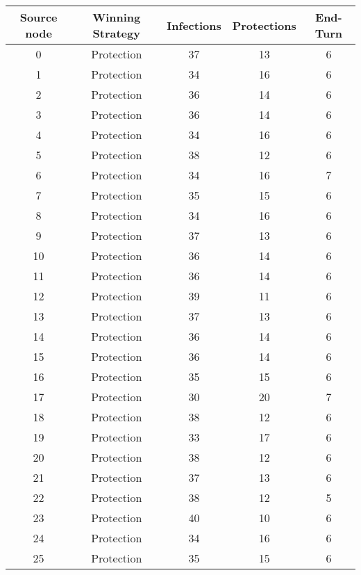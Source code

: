 \documentclass[results.tex]{subfiles}
\begin{document}
\begin{center}
  \begin{tabular}{| c || c | c | c | c |}
    \hline
    {\bfseries Source node} & {\bfseries Winning Strategy} & {\bfseries Infections} & {\bfseries Protections} & {\bfseries End-Turn} \\  %
    \hline\hline
    0 & Protection & 37 & 13 & 6 \\ 
    \hline
    1 & Protection & 34 & 16 & 6 \\ 
    \hline
    2 & Protection & 36 & 14 & 6 \\ 
    \hline
    3 & Protection & 36 & 14 & 6 \\ 
    \hline
    4 & Protection & 34 & 16 & 6 \\ 
    \hline
    5 & Protection & 38 & 12 & 6 \\ 
    \hline
    6 & Protection & 34 & 16 & 7 \\ 
    \hline
    7 & Protection & 35 & 15 & 6 \\ 
    \hline
    8 & Protection & 34 & 16 & 6 \\ 
    \hline
    9 & Protection & 37 & 13 & 6 \\ 
    \hline
    10 & Protection & 36 & 14 & 6 \\ 
    \hline
    11 & Protection & 36 & 14 & 6 \\ 
    \hline
    12 & Protection & 39 & 11 & 6 \\ 
    \hline
    13 & Protection & 37 & 13 & 6 \\ 
    \hline
    14 & Protection & 36 & 14 & 6 \\ 
    \hline
    15 & Protection & 36 & 14 & 6 \\ 
    \hline
    16 & Protection & 35 & 15 & 6 \\ 
    \hline
    17 & Protection & 30 & 20 & 7 \\ 
    \hline
    18 & Protection & 38 & 12 & 6 \\ 
    \hline
    19 & Protection & 33 & 17 & 6 \\ 
    \hline
    20 & Protection & 38 & 12 & 6 \\ 
    \hline
    21 & Protection & 37 & 13 & 6 \\ 
    \hline
    22 & Protection & 38 & 12 & 5 \\ 
    \hline
    23 & Protection & 40 & 10 & 6 \\ 
    \hline
    24 & Protection & 34 & 16 & 6 \\ 
    \hline
    25 & Protection & 35 & 15 & 6 \\ 

\end{tabular}
\end{center}
\end{document}
